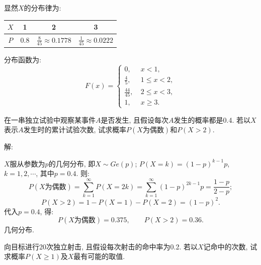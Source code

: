 \documentclass[standard]{ExBook}
\renewenvironment{shaded}{%
  \def\FrameCommand{\fboxsep=\FrameSep \colorbox{shadecolor}}%
  \MakeFramed{\advance\hsize-\width \FrameRestore}%
}{%
  \endMakeFramed
}
\begin{document}
\begin{qitems}
显然$X$的分布律为:
\begin{center}
\setlength{\tabcolsep}{30pt}
\begin{tabular}{c|c|c|c}
    \hline
    $X$ & 1 & 2 & 3 \\
    \hline
    $P$ & 0.8 & $\frac{8}{45}\approx0.1778$ & $\frac{1}{45}\approx0.0222$\\
    \hline
\end{tabular}
\end{center}
分布函数为:
$$
    F(x)=
    \left\{
    \begin{array}{ll}
        0,\ &x < 1,\\
        \frac{4}{5},\ &1 \leq x < 2,\\
        \frac{44}{45},\ &2 \leq x < 3,\\
        1,\ &x \geq 3.
    \end{array}
    \right.
$$

\vspace{2.5cm-5em}

    \begin{bbox}
    \begin{shaded}
        \qitem
在一串独立试验中观察某事件$A$是否发生, 且假设每次$A$发生的概率都是0.4. 若以$X$表示$A$发生时的累计试验次数, 试求概率$P(X\text{为偶数})$和$P(X > 2)$.
    \end{shaded}
    \end{bbox}

\vspace{\dimexpr2.5cm-5em\relax}

解: 

$X$服从参数为$p$的几何分布, 即$X\sim Ge(p)$; $P(X=k)=(1-p)^{k-1}p$, $k=1,2,\cdots$, 其中$p=0.4$. 则:
$$P(X\text{为偶数})=\sum\limits_{k=1}^{\infty}P(X=2k)=\sum\limits_{k=1}^{\infty}(1-p)^{2k-1}p=\frac{1-p}{2-p};$$
$$P(X > 2)=1-P(X=1)-P(X=2)=(1-p)^2.$$
代入$p=0.4$, 得:
$$P(X\text{为偶数})=0.375,\qquad P(X > 2)=0.36.$$
\textcolor{themeColor}{\selectfont {} 几何分布.}

\vspace{2.5cm-5em}

    \begin{bbox}
    \begin{shaded}
        \qitem
向目标进行20次独立射击, 且假设每次射击的命中率为0.2. 若以$X$记命中的次数, 试求概率$P(X \geq 1)$及$X$最有可能的取值.
    \end{shaded}
    \end{bbox}

\vspace{\dimexpr2.5cm-5em\relax}


\end{qitems}
\end{document}
